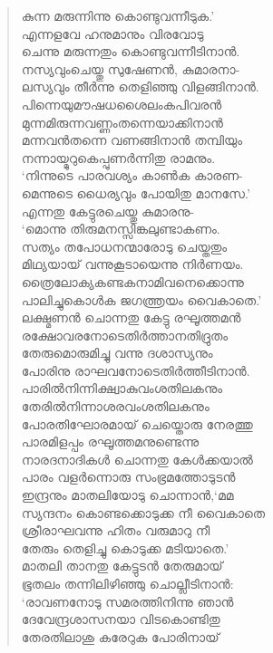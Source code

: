 \begin{verse}
കുന്ന മരുന്നിന്നു കൊണ്ടുവന്നീടുക.’\\
എന്നളവേ ഹനുമാനും വിരവോടു\\
ചെന്നു മരുന്നതും കൊണ്ടുവന്നീടിനാന്‍.\\
നസ്യവുംചെയ്തു സുഷേണന്‍, കുമാരനാ-\\
ലസ്യവും തീര്‍ന്നു തെളിഞ്ഞു വിളങ്ങിനാന്‍.\\
പിന്നെയുമൗഷധശൈലംകപിവരന്‍\\
മുന്നമിരുന്നവണ്ണംതന്നെയാക്കിനാന്‍\\
മന്നവന്‍തന്നെ വണങ്ങിനാന്‍ തമ്പിയും\\
നന്നായ്മുറുകെപ്പുണര്‍ന്നിതു രാമനും.\\
‘നിന്നുടെ പാരവശ്യം കാണ്‍ക കാരണ-\\
മെന്നുടെ ധൈര്യവും പോയിതു മാനസേ.’\\
എന്നതു കേട്ടുരചെയ്തു കുമാരനു-\\
‘മൊന്നു തിരുമനസ്സിങ്കലുണ്ടാകണം.\\
സത്യം തപോധനന്മാരോടു ചെയ്തതും\\
മിഥ്യയായ് വന്നുകൂടായെന്നു നിര്‍ണയം.\\
ത്രൈലോക്യകണ്ടകനാമിവനെക്കൊന്നു\\
പാലിച്ചുകൊള്‍ക ജഗത്ത്രയം വൈകാതെ.’\\
ലക്ഷ്മണന്‍ ചൊന്നതു കേട്ടു രഘൂത്തമന്‍\\
രക്ഷോവരനോടെതിര്‍ത്താനതിദ്രുതം\\
തേരുമൊരുമിച്ചു വന്നു ദശാസ്യനും\\
പോരിനു രാഘവനോടെതിര്‍ത്തീടിനാന്‍.\\
പാരില്‍നിന്നിക്ഷ്വാകുവംശതിലകനും\\
തേരില്‍നിന്നാശരവംശതിലകനും\\
പോരതിഘോരമായ് ചെയ്തൊരു നേരത്തു\\
പാരമിളപ്പം രഘൂത്തമനുണ്ടെന്നു\\
നാരദനാദികള്‍ ചൊന്നതു കേള്‍ക്കയാല്‍\\
പാരം വളര്‍ന്നൊരു സംഭ്രമത്തോടുടന്‍\\
ഇന്ദ്രനും മാതലിയോടു ചൊന്നാന്‍,‘മമ\\
സ്യന്ദനം കൊണ്ടക്കൊടുക്ക നീ വൈകാതെ\\
ശ്രീരാഘവന്നു ഹിതം വരുമാറു നീ\\
തേരും തെളിച്ചു കൊടുക്ക മടിയാതെ.’\\
മാതലി താനതു കേട്ടുടന്‍ തേരുമായ്\\
ഭൂതലം തന്നിലിഴിഞ്ഞു ചൊല്ലീടിനാന്‍:\\
‘രാവണനോടു സമരത്തിനിന്നു ഞാന്‍\\
ദേവേന്ദ്രശാസനയാ വിടകൊണ്ടിതു\\
തേരതിലാശു കരേറുക പോരിനായ്\\

\end{verse}
